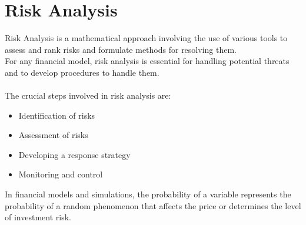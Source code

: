 \documentclass[12pt,two column]{article}
\begin{document}
\section{Risk Analysis}
Risk Analysis is a mathematical approach involving the use of various tools to assess and rank risks and formulate methods for resolving them.\\
For any financial model, risk analysis is essential for handling potential threats and to develop procedures to handle them.\\ \\
The crucial steps involved in risk analysis are:
\begin{itemize}
    \item Identification of risks
    \item Assessment of risks
    \item Developing a response strategy
    \item Monitoring and control
\end{itemize}

In financial models and simulations, the probability of a variable represents the probability of a random phenomenon that affects the price or determines the level of investment risk.
\end{document}
